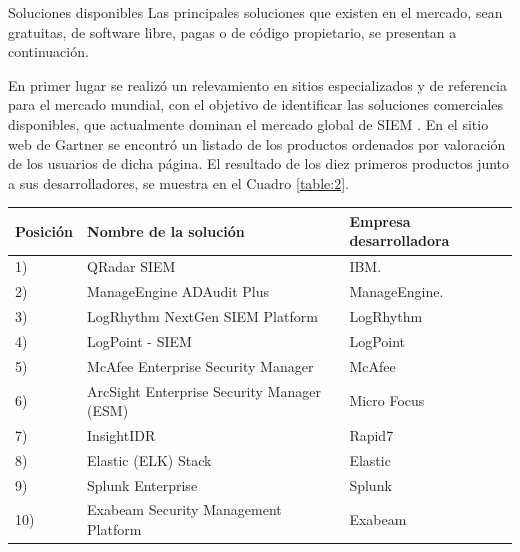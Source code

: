     \begin{section}{Soluciones disponibles}
    Las principales soluciones que existen en el mercado, sean gratuitas, de software libre, pagas o de código propietario,  se presentan a continuación.\par
    En primer lugar se realizó un relevamiento en sitios especializados y de referencia para el mercado mundial, con el objetivo de identificar las soluciones comerciales disponibles, que actualmente dominan el mercado global de SIEM . En el sitio web de Gartner \cite{ranking} se encontró un listado de los productos ordenados por valoración de los usuarios de dicha página. El resultado de los diez primeros productos junto a sus desarrolladores, se muestra en el Cuadro \ref{table:2}. \par
    \begin{center}
        \begin{table}[H]
        \centering
        \begin{tabular}{ | m{4em} | m{22em}| m{12em} | }
            \hline
            Posición & Nombre de la solución & Empresa desarrolladora \\ 
            \hline
            1) & QRadar SIEM\cite{qradar} & IBM. \\ 
            \hline
            2) & ManageEngine ADAudit Plus\cite{adaudit} & ManageEngine. \\ 
            \hline
            3) & LogRhythm NextGen SIEM Platform\cite{logrhythm}
             & LogRhythm
            \\ 
             \hline
            4) & LogPoint - SIEM\cite{logpoint} & LogPoint  \\
             \hline
            5) & McAfee Enterprise Security Manager\cite{enterprise} & McAfee  \\
             \hline
            6) & ArcSight Enterprise Security Manager (ESM)\cite{arcsight} & Micro Focus  \\
             \hline
            7) & InsightIDR\cite{insight} & Rapid7  \\
             \hline
            8) & Elastic (ELK) Stack\cite{elastic} & Elastic  \\
             \hline
            9) & Splunk Enterprise\cite{splunk} & Splunk  \\
             \hline
            10) & Exabeam Security Management Platform\cite{exabeam} & Exabeam \\
            \hline %
        \end{tabular}

\end{table}
\end{center}
\end{section}
